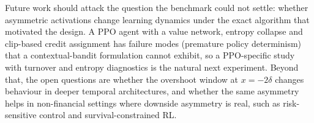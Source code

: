 \documentclass[conference]{IEEEtran}
\begin{document}
Future work should attack the question the benchmark could not settle: whether asymmetric activations change learning dynamics under the exact algorithm that motivated the design. A PPO agent with a value network, entropy collapse and clip-based credit assignment has failure modes (premature policy determinism) that a contextual-bandit formulation cannot exhibit, so a PPO-specific study with turnover and entropy diagnostics is the natural next experiment. Beyond that, the open questions are whether the overshoot window at $x = -2\delta$ changes behaviour in deeper temporal architectures, and whether the same asymmetry helps in non-financial settings where downside asymmetry is real, such as risk-sensitive control and survival-constrained RL.


{\footnotesize

}
\end{document}
